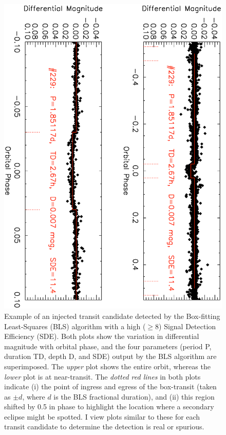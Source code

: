 \begin{figure}
\begin{center}
\centering
\includegraphics[width=.75\textwidth, angle=90]{7_highsde}
\caption[Example of an injected transit candidate with a high SDE]{%
Example of an injected transit candidate detected by the Box-fitting Least-Squares (BLS) algorithm with a high ($\geq$8) Signal Detection Efficiency (SDE).
Both plots show the variation in differential magnitude with orbital phase, and the four parameters (period P, duration TD, depth D, and SDE) output by the BLS algorithm are superimposed.
The {\it upper} plot shows the entire orbit, whereas the {\it lower} plot is at near-transit.
The {\it dotted red lines} in both plots indicate (i) the point of ingress and egress of the box-transit (taken as $\pm d$, where $d$ is the BLS fractional duration), and (ii) this region shifted by 0.5 in phase to highlight the location where a secondary eclipse might be spotted.
I view plots similar to these for each transit candidate to determine the detection is real or spurious.%
}
\label{cha:human:sec:model:fig:highsde}
\end{center}
\end{figure}

